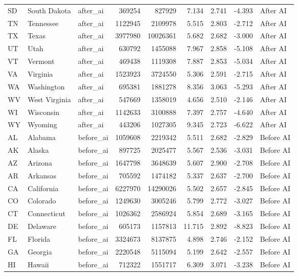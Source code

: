 \begin{tabular}{lllrrrrrl}
SD & South Dakota & after\_ai & 369254 & 827929 & 7.134 & 2.741 & -4.393 & After AI \\
TN & Tennessee & after\_ai & 1122945 & 2109978 & 5.515 & 2.803 & -2.712 & After AI \\
TX & Texas & after\_ai & 3977980 & 10026361 & 5.682 & 2.682 & -3.000 & After AI \\
UT & Utah & after\_ai & 630792 & 1455088 & 7.967 & 2.858 & -5.108 & After AI \\
VT & Vermont & after\_ai & 469438 & 1119308 & 7.887 & 2.853 & -5.034 & After AI \\
VA & Virginia & after\_ai & 1523923 & 3724550 & 5.306 & 2.591 & -2.715 & After AI \\
WA & Washington & after\_ai & 695381 & 1881278 & 8.356 & 3.063 & -5.293 & After AI \\
WV & West Virginia & after\_ai & 547669 & 1358019 & 4.656 & 2.510 & -2.146 & After AI \\
WI & Wisconsin & after\_ai & 1142633 & 3100888 & 7.397 & 2.757 & -4.640 & After AI \\
WY & Wyoming & after\_ai & 443206 & 1027305 & 9.345 & 2.723 & -6.622 & After AI \\
AL & Alabama & before\_ai & 1059608 & 2219342 & 5.511 & 2.682 & -2.829 & Before AI \\
AK & Alaska & before\_ai & 897725 & 2025477 & 5.567 & 2.536 & -3.031 & Before AI \\
AZ & Arizona & before\_ai & 1647798 & 3648639 & 5.607 & 2.900 & -2.708 & Before AI \\
AR & Arkansas & before\_ai & 705592 & 1474182 & 5.337 & 2.637 & -2.700 & Before AI \\
CA & California & before\_ai & 6227970 & 14290026 & 5.502 & 2.657 & -2.845 & Before AI \\
CO & Colorado & before\_ai & 1249630 & 3005246 & 5.799 & 2.772 & -3.027 & Before AI \\
CT & Connecticut & before\_ai & 1026362 & 2586924 & 5.854 & 2.689 & -3.165 & Before AI \\
DE & Delaware & before\_ai & 605173 & 1157813 & 11.715 & 2.892 & -8.823 & Before AI \\
FL & Florida & before\_ai & 3324673 & 8137875 & 4.898 & 2.746 & -2.152 & Before AI \\
GA & Georgia & before\_ai & 2220548 & 5115094 & 5.199 & 2.642 & -2.557 & Before AI \\
HI & Hawaii & before\_ai & 712322 & 1551717 & 6.309 & 3.071 & -3.238 & Before AI \\

\end{tabular}
